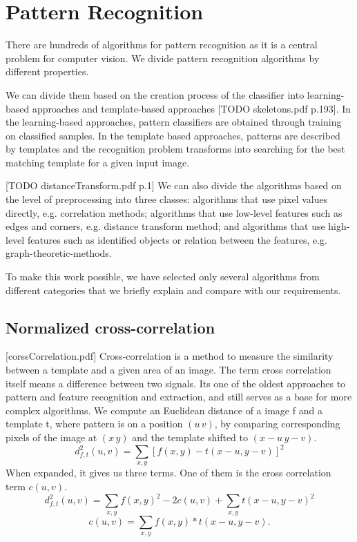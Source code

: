 \chapter{Pattern Recognition}

There are hundreds of algorithms for pattern recognition as it is a central problem for computer vision. We divide pattern recognition algorithms by different properties.

We can divide them based on the creation process of the classifier into learning-based approaches and template-based approaches [TODO skeletons.pdf p.193]. In the learning-based approaches, pattern classifiers are obtained through training on classified samples. In the template based approaches, patterns are described by templates and the recognition problem transforms into searching for the best matching template for a given input image.

[TODO distanceTransform.pdf p.1]
We can also divide the algorithms based on the level of preprocessing into three classes: algorithms that use pixel values directly, e.g. correlation methods; algorithms that use low-level features such as edges and corners, e.g. distance transform method; and algorithms that use high-level features such as identified objects or relation between the features, e.g. graph-theoretic-methods. 

To make this work possible, we have selected only several algorithms from different categories that we briefly explain and compare with our requirements.

\section{Normalized cross-correlation}
[corssCorrelation.pdf]
Cross-correlation is a method to measure the similarity between a template and a given area of an image. The term cross correlation itself means a difference between two signals. Its one of the oldest approaches to pattern and feature recognition and extraction, and still serves as a base for more complex algorithms.
We compute an Euclidean distance of a image f and a template t, where pattern is on a position $(u\,v)$, by comparing corresponding pixels of the image at $(x\,y)$ and the template shifted to $(x-u\,y-v)$. 
\begin{equation*}
d_{f,t}^{2}(u,v)=\sum_{x,y} [ f(x,y) - t(x-u, y-v) ]^{2} 
\end{equation*}
When expanded, it gives us three terms. One of them is the cross correlation term $c(u,v)$.
\begin{equation*}
d_{f,t}^{2}(u,v)=\sum_{x,y} f(x,y)^{2} - 2c(u,v) + \sum_{x,y} t(x-u, y-v)^2
\end{equation*}
\begin{equation*}
c(u,v)=\sum_{x,y} f(x,y) * t(x-u, y-v).
\end{equation*}

